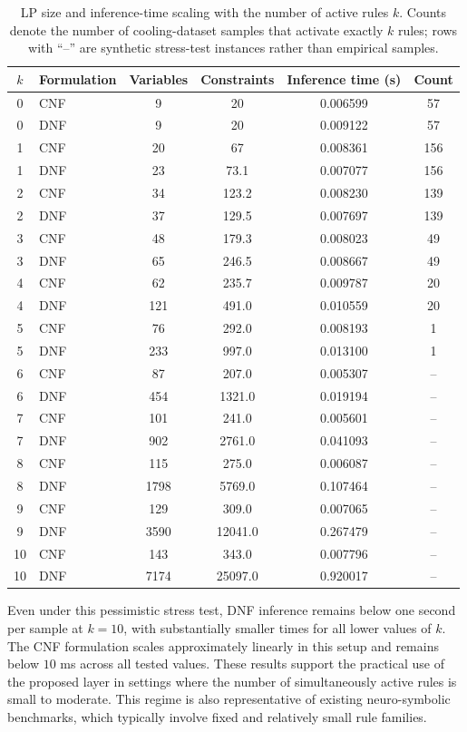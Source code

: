 \documentclass{article}
\theoremstyle{plain}
\theoremstyle{definition}
\theoremstyle{remark}
\begin{document}
\begin{table}[h]
\centering
\caption{LP size and inference-time scaling with the number of active rules $k$. Counts denote the number of cooling-dataset samples that activate exactly $k$ rules; rows with ``--'' are synthetic stress-test instances rather than empirical samples.}
\label{tab:k-scaling}
\begin{tabular}{clcccc}
\toprule
$k$ & Formulation & Variables & Constraints & Inference time (s) & Count \\
\midrule
0  & CNF & 9    & 20     & 0.006599 & 57 \\
0  & DNF & 9    & 20     & 0.009122 & 57 \\
1  & CNF & 20   & 67     & 0.008361 & 156 \\
1  & DNF & 23   & 73.1   & 0.007077 & 156 \\
2  & CNF & 34   & 123.2  & 0.008230 & 139 \\
2  & DNF & 37   & 129.5  & 0.007697 & 139 \\
3  & CNF & 48   & 179.3  & 0.008023 & 49 \\
3  & DNF & 65   & 246.5  & 0.008667 & 49 \\
4  & CNF & 62   & 235.7  & 0.009787 & 20 \\
4  & DNF & 121  & 491.0  & 0.010559 & 20 \\
5  & CNF & 76   & 292.0  & 0.008193 & 1 \\
5  & DNF & 233  & 997.0  & 0.013100 & 1 \\
6  & CNF & 87   & 207.0  & 0.005307 & -- \\
6  & DNF & 454  & 1321.0 & 0.019194 & -- \\
7  & CNF & 101  & 241.0  & 0.005601 & -- \\
7  & DNF & 902  & 2761.0 & 0.041093 & -- \\
8  & CNF & 115  & 275.0  & 0.006087 & -- \\
8  & DNF & 1798 & 5769.0 & 0.107464 & -- \\
9  & CNF & 129  & 309.0  & 0.007065 & -- \\
9  & DNF & 3590 & 12041.0 & 0.267479 & -- \\
10 & CNF & 143  & 343.0  & 0.007796 & -- \\
10 & DNF & 7174 & 25097.0 & 0.920017 & -- \\
\bottomrule
\end{tabular}
\end{table}

Even under this pessimistic stress test, DNF inference remains below one second per sample at $k=10$, with substantially smaller times for all lower values of $k$. The CNF formulation scales approximately linearly in this setup and remains below $10$ ms across all tested values. These results support the practical use of the proposed layer in settings where the number of simultaneously active rules is small to moderate. This regime is also representative of existing neuro-symbolic benchmarks, which typically involve fixed and relatively small rule families.
\end{document}
